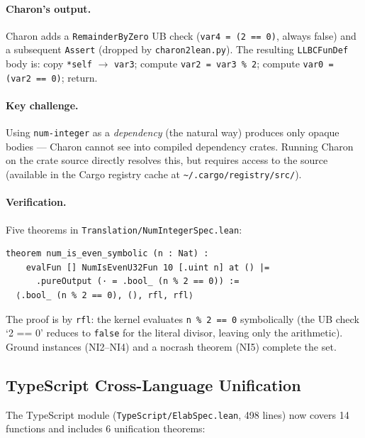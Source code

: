 \paragraph{Charon's output.}
Charon adds a \texttt{RemainderByZero} UB check
(\texttt{var4 = (2 == 0)}, always false) and a subsequent \texttt{Assert}
(dropped by \texttt{charon2lean.py}).
The resulting \texttt{LLBCFunDef} body is:
copy \texttt{*self} $\to$ \texttt{var3}; compute \texttt{var2 = var3 \% 2};
compute \texttt{var0 = (var2 == 0)}; return.

\paragraph{Key challenge.}
Using \texttt{num-integer} as a \emph{dependency} (the natural way)
produces only opaque bodies — Charon cannot see into compiled
dependency crates. Running Charon on the crate source directly
resolves this, but requires access to the source (available in
the Cargo registry cache at \texttt{\textasciitilde/.cargo/registry/src/}).

\paragraph{Verification.}
Five theorems in \texttt{Translation/NumIntegerSpec.lean}:

\begin{lstlisting}[caption={NI1 (symbolic): Integer::is\_even<u32> verified.},
                   label={lst:nispec}]
theorem num_is_even_symbolic (n : Nat) :
    evalFun [] NumIsEvenU32Fun 10 [.uint n] at () |=
      .pureOutput (· = .bool_ (n % 2 == 0)) :=
  ⟨.bool_ (n % 2 == 0), (), rfl, rfl⟩
\end{lstlisting}

The proof is by \texttt{rfl}: the kernel evaluates
\texttt{n \% 2 == 0} symbolically (the UB check `2 == 0' reduces to
\texttt{false} for the literal divisor, leaving only the arithmetic).
Ground instances (NI2--NI4) and a nocrash theorem (NI5) complete the set.

\subsection{TypeScript Cross-Language Unification}
\label{sec:eval-ts}

The TypeScript module (\texttt{TypeScript/ElabSpec.lean}, 498 lines) now
covers 14 functions and includes 6 unification theorems:

